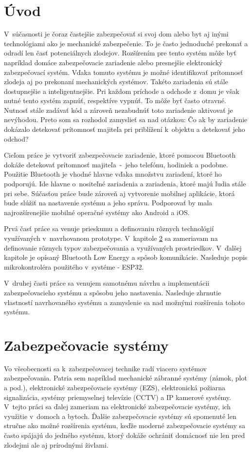 \chapter{Úvod}

V~súčasnosti je čoraz častejšie zabezpečovať si svoj dom alebo byt aj inými technológiami ako je mechanické zabezpečenie. To je často jednoduché prekonať a odradí len časť potenciálnych zlodejov. Rozšírením pre tento systém môže byť napríklad domáce zabezpečovacie zariadenie alebo presnejšie elektronický zabezpečovací systém. Vďaka tomuto systému je možné identifikovať prítomnosť zlodeja aj po prekonaní mechanických systémov. Takéto zariadenia sú stále dostupnejšie a inteligentnejšie. Pri každom príchode a odchode z~domu je však nutné tento systém zapnúť, respektíve vypnúť. To môže byť často otravné. Nutnosť stále zadávať kód a zároveň nezabudnúť toto zariadenie aktivovať je nevýhodou. Preto som sa rozhodol zamyslieť sa nad otázkou: Čo ak by zariadenie dokázalo detekovať prítomnosť majiteľa pri priblížení k~objektu a detekovať jeho odchod?

Cieľom práce je vytvoriť zabezpečovacie zariadenie, ktoré pomocou Bluetooth dokáže detekovať prítomnosť majiteľa~-~jeho telefónu, hodiniek a podobne. Použitie Bluetooth je vhodné hlavne vďaka množstvu zariadení, ktoré ho podporujú. Ide hlavne o~nositeľné zariadenia a zariadenia, ktoré majú ľudia stále pri sebe.
Súčasťou práce bude zároveň aj vytvorenie mobilnej aplikácie, ktorá bude slúžiť na nastavenie systému a jeho správu. Podporovať by mala najrozšírenejšie mobilné operačné systémy ako Android a iOS.

Prvá časť práce sa venuje prieskumu a definovaniu rôznych technológií využívaných v~navrhovanom prototype. V~kapitole \ref{chap:ZS} sa zameriavam na definovanie rôznych typov zabezpečovania a využívaných prostriedkov. V~ďalšej kapitole je opísaný Bluetooth Low Energy a spôsob komunikácie. Nasleduje popis mikrokontroléra použitého v~systéme - ESP32.

V~druhej časti práce sa venujem samotnému návrhu a implementácii zabezpečovacieho systému a spôsobu jeho nastavenia. Nasleduje zhrnutie vlastností navrhovaného systému a zamyslenie sa nad možnými rozšírenia tohoto systému.

\chapter{Zabezpečovacie systémy}\label{chap:ZS}

Vo všeobecnosti sa k~zabezpečovacej technike radí viacero systémov zabezpečovania. Patria sem napríklad mechanické zábranné systémy (zámok, plot a pod.), elektronické zabezpečovacie systémy (EZS), elektronická požiarna signalizácia, systémy priemyselnej televízie (CCTV) a IP kamerové systémy. V~tejto práci sa ďalej zameriam na elektronické zabezpečovacie systémy, ich využitie v~domoch a bytoch. Ďalšie zabezpečovacie systémy sú spomenuté len stručne ako možné rozšírenia systému, keďže moderné zabezpečovacie systémy sa často spájajú do jedného systému, ktorý dokáže ochrániť domácnosť nie len pred zlodejmi ale aj prírodnými živlami.

